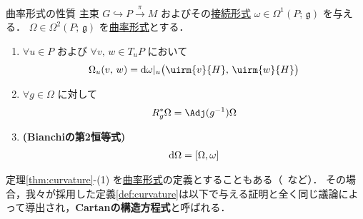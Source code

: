 \documentclass[geometry_main]{subfiles}
\begin{document}
\begin{mytheo}[label=thm:curvature]{曲率形式の性質}
    主束 $G \hookrightarrow P \xrightarrow{\pi} M$ およびその\hyperref[def:connection]{接続形式} $\omega \in \Omega^1(P;\, \mathfrak{g})$ を与える．
    $\Omega \in \Omega^2 (P;\, \mathfrak{g})$ を\hyperref[def:curvature]{曲率形式}とする．

    \begin{enumerate}
        \item $\forall u \in P$ および $\forall v,\, w \in T_u P$ において
        \begin{align}
            \Omega_u (v,\, w) = \dd \omega|_u \bigl( \uirm{v}{H},\, \uirm{w}{H} \bigr) 
        \end{align}
        \item $\forall g \in \Omega$ に対して
        \begin{align}
            R_g^* \Omega = \Adj (g^{-1}) \Omega
        \end{align}
        
        \item \textbf{(Bianchiの第2恒等式)}
        \begin{align}
            \dd{\Omega} = \comm{\Omega}{\omega}
        \end{align}
    \end{enumerate}
    
\end{mytheo}

\begin{marker}
    定理\ref{thm:curvature}-(1) を\hyperref[def:curvature]{曲率形式}の定義とすることもある（~\cite[p.43]{Nakahara2018topo2}など）．
    その場合，我々が採用した定義\ref{def:curvature}は以下で与える証明と全く同じ議論によって導出され，\textbf{Cartanの構造方程式}と呼ばれる．
\end{marker}
\end{document}
